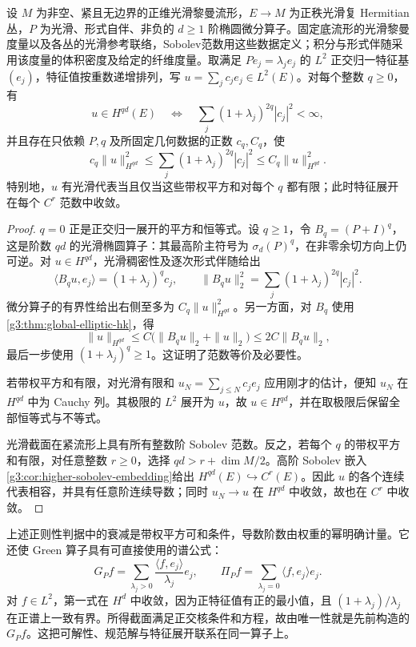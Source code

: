 \begin{theorem}\label{g3:thm:elliptic-spectral-sobolev}
	设 \(M\) 为非空、紧且无边界的正维光滑黎曼流形，\(E\to M\) 为正秩光滑复 Hermitian 丛，\(P\) 为光滑、形式自伴、非负的 \(d\ge1\) 阶椭圆微分算子。固定底流形的光滑黎曼度量以及各丛的光滑参考联络，Sobolev范数用这些数据定义；积分与形式伴随采用该度量的体积密度及给定的纤维度量。取满足 \(Pe_j=\lambda_je_j\) 的 \(L^2\) 正交归一特征基 \((e_j)\)，特征值按重数递增排列，写 \(u=\sum_jc_je_j\in L^2(E)\)。对每个整数 \(q\ge0\)，有
	\begin{equation}\label{g3:eq:spectral-sobolev-weight}
		u\in H^{qd}(E)
		\quad\Longleftrightarrow\quad
		\sum_j(1+\lambda_j)^{2q}|c_j|^2<\infty,
	\end{equation}
	并且存在只依赖 \(P,q\) 及所固定几何数据的正数 \(c_q,C_q\)，使
	\[
		c_q\|u\|_{H^{qd}}^2
		\le\sum_j(1+\lambda_j)^{2q}|c_j|^2
		\le C_q\|u\|_{H^{qd}}^2.
	\]
	特别地，\(u\) 有光滑代表当且仅当这些带权平方和对每个 \(q\) 都有限；此时特征展开在每个 \(C^r\) 范数中收敛。
\end{theorem}
\begin{proof}
	\(q=0\) 正是正交归一展开的平方和恒等式。设 \(q\ge1\)，令 \(B_q=(P+I)^q\)，这是阶数 \(qd\) 的光滑椭圆算子：其最高阶主符号为 \(\sigma_d(P)^q\)，在非零余切方向上仍可逆。对 \(u\in H^{qd}\)，光滑稠密性及逐次形式伴随给出
	\[
		\langle B_qu,e_j\rangle=(1+\lambda_j)^qc_j,
		\qquad
		\|B_qu\|_2^2=\sum_j(1+\lambda_j)^{2q}|c_j|^2.
	\]
	微分算子的有界性给出右侧至多为 \(C_q\|u\|_{H^{qd}}^2\)。另一方面，对 \(B_q\) 使用\cref{g3:thm:global-elliptic-hk}，得
	\[
		\|u\|_{H^{qd}}\le C\bigl(\|B_qu\|_2+\|u\|_2\bigr)
		\le2C\|B_qu\|_2,
	\]
	最后一步使用 \((1+\lambda_j)^q\ge1\)。这证明了范数等价及必要性。

	若带权平方和有限，对光滑有限和 \(u_N=\sum_{j\le N}c_je_j\) 应用刚才的估计，便知 \(u_N\) 在 \(H^{qd}\) 中为 Cauchy 列。其极限的 \(L^2\) 展开为 \(u\)，故 \(u\in H^{qd}\)，并在取极限后保留全部恒等式与不等式。

	光滑截面在紧流形上具有所有整数阶 Sobolev 范数。反之，若每个 \(q\) 的带权平方和有限，对任意整数 \(r\ge0\)，选择 \(qd>r+\dim M/2\)。高阶 Sobolev 嵌入\cref{g3:cor:higher-sobolev-embedding}给出 \(H^{qd}(E)\hookrightarrow C^r(E)\)。因此 \(u\) 的各个连续代表相容，并具有任意阶连续导数；同时 \(u_N\to u\) 在 \(H^{qd}\) 中收敛，故也在 \(C^r\) 中收敛。
\end{proof}

上述正则性判据中的衰减是带权平方可和条件，导数阶数由权重的幂明确计量。它还使 Green 算子具有可直接使用的谱公式：
\begin{equation}\label{g3:eq:green-spectral-series}
	G_Pf=\sum_{\lambda_j>0}\frac{\langle f,e_j\rangle}{\lambda_j}e_j,
	\qquad
	\Pi_Pf=\sum_{\lambda_j=0}\langle f,e_j\rangle e_j.
\end{equation}
对 \(f\in L^2\)，第一式在 \(H^d\) 中收敛，因为正特征值有正的最小值，且 \((1+\lambda_j)/\lambda_j\) 在正谱上一致有界。所得截面满足正交核条件和方程，故由唯一性就是先前构造的 \(G_Pf\)。这把可解性、规范解与特征展开联系在同一算子上。

